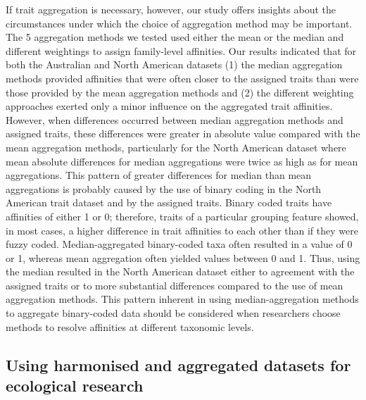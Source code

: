 \documentclass[12pt]{article}
\begin{document}
If trait aggregation is necessary, however, our study offers insights about the circumstances under which the choice of aggregation method may be important. The 5 aggregation methods we tested used either the mean or the median and different weightings to assign family-level affinities. Our results indicated that for both the Australian and North American datasets (1) the median aggregation methods provided affinities that were often closer to the assigned traits than were those provided by the mean aggregation methods and (2) the different weighting approaches exerted only a minor influence on the aggregated trait affinities. However, when differences occurred between median aggregation methods and assigned traits, these differences were greater in absolute value compared with the mean aggregation methods, particularly for the North American dataset where mean absolute differences for median aggregations were twice as high as for mean aggregations. This pattern of greater differences for median than mean aggregations is probably caused by the use of binary coding in the North American trait dataset and by the assigned traits. Binary coded traits have affinities of either 1 or 0; therefore, traits of a particular grouping feature showed, in most cases, a higher difference in trait affinities to each other than if they were fuzzy coded. Median-aggregated binary-coded taxa often resulted in a value of 0 or 1, whereas mean aggregation often yielded values between 0 and 1. Thus, using the median resulted in the North American dataset either to agreement with the assigned traits or to more substantial differences compared to the use of mean aggregation methods. This pattern inherent in using median-aggregation methods to aggregate binary-coded data should be considered when researchers choose methods to resolve affinities at different taxonomic levels. 

\subsection*{Using harmonised and aggregated datasets for ecological research}
\end{document}

